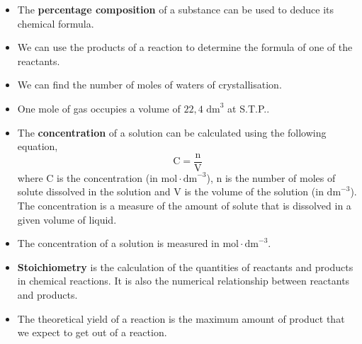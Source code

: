 \begin{itemize}[noitemsep]
\item The \textbf{percentage composition} of a substance can be used to deduce its chemical formula.
\item We can use the products of a reaction to determine the formula of one of the reactants. 
\item We can find the number of moles of waters of crystallisation.
\item One mole of gas occupies a volume of $22,4 {\text{ dm}}^{3}$ at S.T.P..
\item The \textbf{concentration} of a solution can be calculated using the following equation,
\label{m38712*id286019}\nopagebreak\noindent{}
    \begin{equation*}
    \text{C}=\frac{\text{n}}{\text{V}}
      \end{equation*}
where C is the concentration (in $\text{mol} \cdot {\text{dm}}^{-3}$), n is the number of moles of solute dissolved in the solution and V is the volume of the solution (in ${\text{dm}}^{-3}$). The concentration is a measure of the amount of solute that is dissolved in a given volume of liquid.
\item The concentration of a solution is measured in $\text{mol} \cdot {\text{dm}}^{-3}$.
\item \textbf{Stoichiometry} is the calculation of the quantities of reactants and products in chemical reactions. It is also the numerical relationship between reactants and products.
\item The theoretical yield of a reaction is the maximum amount of product that we expect to get out of a reaction.\end{itemize}
\label{m38712*secfhsst!!!underscore!!!id2334}
